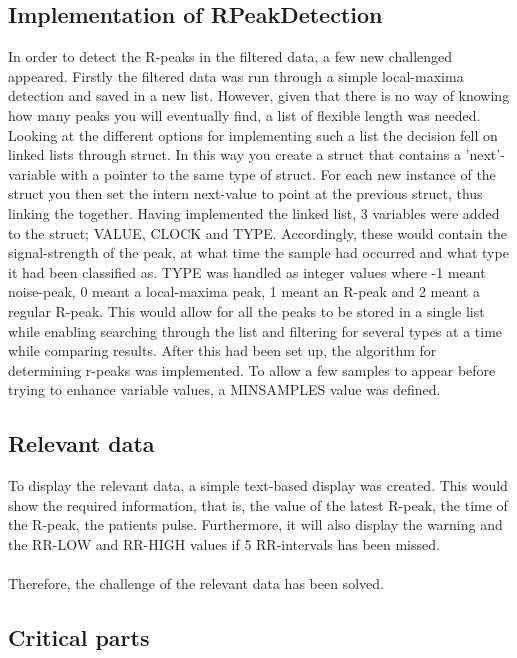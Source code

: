 \documentclass[12pt,a4paper]{article}
\begin{document}
\subsection{Implementation of RPeakDetection}
In order to detect the R-peaks in the filtered data, a few new challenged appeared. Firstly the filtered data was run through a simple local-maxima detection and saved in a new list. However, given that there is no way of knowing how many peaks you will eventually find, a list of flexible length was needed. Looking at the different options for implementing such a list the decision fell on linked lists through struct. In this way you create a struct that contains a 'next'-variable with a pointer to the same type of struct. For each new instance of the struct you then set the intern next-value to point at the previous struct, thus linking the together. 
Having implemented the linked list, 3 variables were added to the struct; VALUE, CLOCK and TYPE. Accordingly, these would contain the signal-strength of the peak, at what time the sample had occurred and what type it had been classified as. TYPE was handled as integer values where -1 meant noise-peak, 0 meant a local-maxima peak, 1 meant an R-peak and 2 meant a regular R-peak. This would allow for all the peaks to be stored in a single list while enabling searching through the list and filtering for several types at a time while comparing results. 
After this had been set up, the algorithm for determining r-peaks was implemented. To allow a few samples to appear before trying to enhance variable values, a MINSAMPLES value was defined.
	
\subsection{Relevant data}
	To display the relevant data, a simple text-based display was created. This would show the required information, that is, the value of the latest R-peak, the time of the R-peak, the patients pulse. Furthermore, it will also display the warning and the RR-LOW and RR-HIGH values if 5 RR-intervals has been missed.\\
	\\
	Therefore, the challenge of the relevant data has been solved.
\subsection{Critical parts}

\begin{figure}[h!]
\end{figure}
\end{document}
